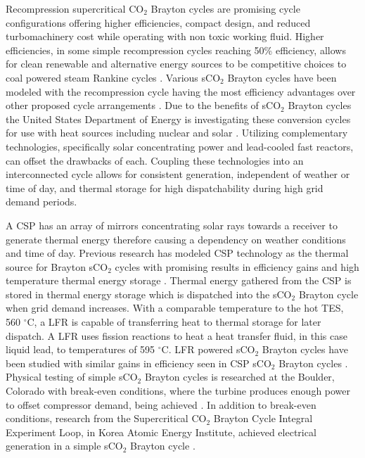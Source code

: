 Recompression supercritical CO$_2$ Brayton cycles are promising cycle configurations offering higher efficiencies, compact design, and reduced turbomachinery cost while operating with non toxic working fluid. Higher efficiencies, in some simple recompression cycles reaching 50\% efficiency, allows for clean renewable and alternative energy sources to be competitive choices to coal powered steam Rankine cycles \cite{turchi_2013,wright_2009}. Various sCO$_2$ Brayton cycles have been modeled with the recompression cycle having the most efficiency advantages over other proposed cycle arrangements \cite{wang_2018,turchi_2012}.  Due to the benefits of sCO$_2$ Brayton cycles the United States Department of Energy is investigating these conversion cycles for use with heat sources including nuclear and solar \cite{doe_2012}. Utilizing complementary technologies, specifically solar concentrating power and lead-cooled fast reactors, can offset the drawbacks of each. Coupling these technologies into an interconnected cycle allows for consistent generation, independent of weather or time of day, and thermal storage for high dispatchability during high grid demand periods.

A CSP has an array of mirrors concentrating solar rays towards a receiver to generate thermal energy therefore causing a dependency on weather conditions and time of day. Previous research has modeled CSP technology as the thermal source for Brayton sCO$_2$ cycles with promising results in efficiency gains and high temperature thermal energy storage \cite{turchi_2012, turchi_2013, ho_2015, wang_2018}. Thermal energy gathered from the CSP is stored in thermal energy storage which is dispatched into the sCO$_2$ Brayton cycle when grid demand increases. With a comparable temperature to the hot TES, 560 $^{\circ}$C, a LFR is capable of transferring heat to thermal storage for later dispatch. A LFR uses fission reactions to heat a heat transfer fluid, in this case liquid lead, to temperatures of 595 $^{\circ}$C. LFR powered sCO$_2$ Brayton cycles have been studied with similar gains in efficiency seen in CSP sCO$_2$ Brayton cycles \cite{dostal_2005, dostal_2004, luo_2020}. Physical testing of simple sCO$_2$ Brayton cycles is researched at the Boulder, Colorado with break-even conditions, where the turbine produces enough power to offset compressor demand, being achieved \cite{wright_2011} . In addition to break-even conditions, research from the Supercritical CO$_2$ Brayton Cycle Integral Experiment Loop, in Korea Atomic Energy Institute, achieved electrical generation in a simple sCO$_2$ Brayton cycle \cite{cha_2016}. 


